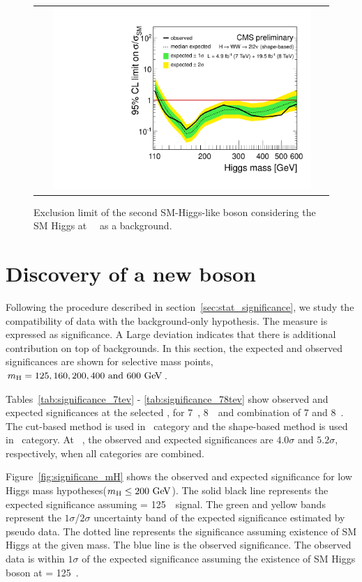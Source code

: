\begin{figure}[htp] 
\centering 
\begin{tabular}{c} 
\includegraphics[width=0.9\textwidth]{figures/ana_Moriond13_2D_SMH_7p8TeV_bdt_from110to600_logx1_logy1.pdf} 
\end{tabular} 
\caption{Exclusion limit of the second SM-Higgs-like boson considering the 
SM Higgs at ~\GeV\ as a background. }
\label{fig:limit78_secondhiggs} 
\end{figure} 




\section{Discovery of a new boson}

Following the procedure described in section~\ref{sec:stat_significance}, 
we study the compatibility of data with the background-only hypothesis. 
The measure is expressed as significance. A Large deviation indicates 
that there is additional contribution on top of backgrounds. 
In this section, the expected and observed significances are shown
for selective mass points, $m_{\mathrm{H}} = 125, 160, 200, 400 \textrm{ and } 600~\mathrm{Ge\kern -0.1em V}$.  

Tables~\ref{tab:significance_7tev} - \ref{tab:significance_78tev}  
show observed and expected significances at the selected \mHi, 
for 7~\TeV, 8~\TeV\ and combination of 7 and 8~\TeV.
The cut-based method is used in \SF\ category 
and the shape-based method is used in \DF\ category.
At ~\GeV, the observed and expected significances
are $4.0\sigma$ and $5.2\sigma$, respectively, 
when all categories are combined.

Figure~\ref{fig:significane_mH} shows the observed and expected 
significance for low Higgs mass hypotheses($m_{\mathrm{H}}\le200~\mathrm{Ge\kern -0.1em V}$). 
The solid black line represents the expected significance assuming 
\mHi = 125~\GeV\ signal. 
The green and yellow bands represent the $1\sigma$/$2\sigma$ uncertainty 
band of the expected significance estimated by pseudo data. 
The dotted line represents the significance 
assuming existence of SM Higgs at the given mass. 
The blue line is the observed significance. 
The observed data is within $1\sigma$ of the expected significance 
assuming the existence of SM Higgs boson at \mHi = 125~\GeV.

